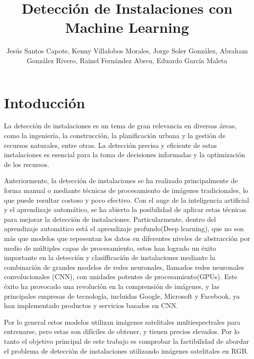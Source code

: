 \documentclass[article]{llncs}
\begin{document}
%
\title{Detecci\'on de Instalaciones con Machine Learning}
%
%
\author{Jes\'us Santos Capote, Kenny Villalobos Morales, Jorge Soler Gonz\'alez, Abraham Gonz\'alez Rivero, 
Rainel Fern\'andez Abreu, Eduardo Garc\'ia Maleta}
%
%
\maketitle              %
%



\section{Intoducci\'on}
La detección de instalaciones es un tema de gran relevancia en diversas áreas, como la ingeniería, la construcción, 
la planificación urbana y la gestión de recursos naturales, entre otras. La detección precisa y 
eficiente de estas instalaciones es esencial para la toma de decisiones informadas y la 
optimización de los recursos.

Anteriormente, la detección de instalaciones se ha realizado principalmente de forma manual o mediante 
técnicas de procesamiento de imágenes tradicionales, lo que puede resultar costoso y poco efectivo. 
Con el auge de la inteligencia artificial y el aprendizaje automático, se ha abierto la posibilidad 
de aplicar estas técnicas para mejorar la detección de instalaciones. Particularmente, dentro del aprendizaje 
automático está el aprendizaje profundo(Deep learning), que no son más que modelos que repesentan los datos en 
diferentes niveles de abstracción por medio de múltiples capas de procesamiento, estos han logrado un éxito importante 
en la detección y clasifficación de instalaciones mediante la combinación de grandes modelos de redes neuronales, 
llamados redes neuronales convolucionales (CNN), con unidades potentes de procesamiento(GPUs). Este éxito ha provocado 
una revolución en la comprensión de imágenes, y las principales empresas de tecnología, incluidas 
Google, Microsoft y Facebook, ya han implementado productos y servicios basados en CNN.

Por lo general estos modelos utilizan imágenes satelitales multiespectrales para entrenarse, pero estas son difíciles de obtener, 
y tienen precios elevados. Por lo tanto el objetivo principal de este trabajo es comprobar la 
factibilidad de abordar el problema de detección de instalaciones utilizando imágenes satelitales 
en RGB.
\end{document}
